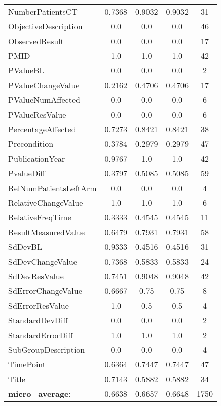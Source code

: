 \begin{longtable}{ l c c c c}
NumberPatientsCT & 0.7368 & 0.9032 & 0.9032 & 31\\
ObjectiveDescription & 0.0 & 0.0 & 0.0 & 46\\
ObservedResult & 0.0 & 0.0 & 0.0 & 17\\
PMID & 1.0 & 1.0 & 1.0 & 42\\
PValueBL & 0.0 & 0.0 & 0.0 & 2\\
PValueChangeValue & 0.2162 & 0.4706 & 0.4706 & 17\\
PValueNumAffected & 0.0 & 0.0 & 0.0 & 6\\
PValueResValue & 0.0 & 0.0 & 0.0 & 6\\
PercentageAffected & 0.7273 & 0.8421 & 0.8421 & 38\\
Precondition & 0.3784 & 0.2979 & 0.2979 & 47\\
PublicationYear & 0.9767 & 1.0 & 1.0 & 42\\
PvalueDiff & 0.3797 & 0.5085 & 0.5085 & 59\\
RelNumPatientsLeftArm & 0.0 & 0.0 & 0.0 & 4\\
RelativeChangeValue & 1.0 & 1.0 & 1.0 & 6\\
RelativeFreqTime & 0.3333 & 0.4545 & 0.4545 & 11\\
ResultMeasuredValue & 0.6479 & 0.7931 & 0.7931 & 58\\
SdDevBL & 0.9333 & 0.4516 & 0.4516 & 31\\
SdDevChangeValue & 0.7368 & 0.5833 & 0.5833 & 24\\
SdDevResValue & 0.7451 & 0.9048 & 0.9048 & 42\\
SdErrorChangeValue & 0.6667 & 0.75 & 0.75 & 8\\
SdErrorResValue & 1.0 & 0.5 & 0.5 & 4\\
StandardDevDiff & 0.0 & 0.0 & 0.0 & 2\\
StandardErrorDiff & 1.0 & 1.0 & 1.0 & 2\\
SubGroupDescription & 0.0 & 0.0 & 0.0 & 4\\
TimePoint & 0.6364 & 0.7447 & 0.7447 & 47\\
Title & 0.7143 & 0.5882 & 0.5882 & 34\\
\textbf{micro\_average}: & 0.6638 & 0.6657 & 0.6648 & 1750 
\label{tab:Glaucoma_eventextr}
\end{longtable}
